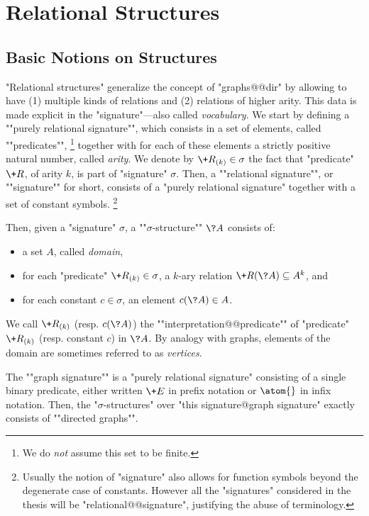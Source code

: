 \section{Relational Structures}

\subsection{Basic Notions on Structures}

"Relational structures" generalize the concept of "graphs@@dir"
by allowing to have (1) multiple kinds of relations and
(2) relations of higher arity. This data is made explicit in
the "signature"---also called \emph{vocabulary}.
We start by defining a \AP""purely relational signature"", which consists
in a set of elements, called ""predicates"",%
\footnote{We do \emph{not} assume this set to be finite.}
together with for each
of these elements a strictly positive natural number, called \emph{arity}.
We denote by $\+R_{(k)} \in \sigma$ the fact that "predicate" $\+R$, of arity
$k$, is part of "signature" $\sigma$.
Then, a ""relational signature"", or ""signature"" for short, consists of a "purely relational 
signature" together with a set of constant symbols.%
\footnote{Usually the notion of "signature" also allows for function symbols beyond
the degenerate case of constants. However all the "signatures" considered in the thesis
will be "relational@@signature", justifying the abuse of terminology.}

Then, given a "signature" $\sigma$, a ""$\sigma$-structure"" $\?A$
consists of:
\begin{itemize}
	\item a set $A$, called \emph{domain},
	\item for each "predicate" $\+R_{(k)} \in \sigma$, a $k$-ary relation
		$\+R(\?A) \subseteq A^k$, and
	\item for each constant $c \in \sigma$, an element $c(\?A) \in A$.
\end{itemize}
We call $\+R_{(k)}$ (resp. $c(\?A)$) the \AP""interpretation@@predicate""
of "predicate" $\+R_{(k)}$ (resp. constant $c$) in $\?A$.
By analogy with graphs, elements of the domain are sometimes referred to as
\emph{vertices}.

The \AP""graph signature"" is a "purely relational signature"
consisting of a single binary predicate, either written $\+E$ in prefix notation
or $\atom{}$ in infix notation.
Then, the "$\sigma$-structures" over "this signature@graph signature"
exactly consists of \AP""directed graphs"".

